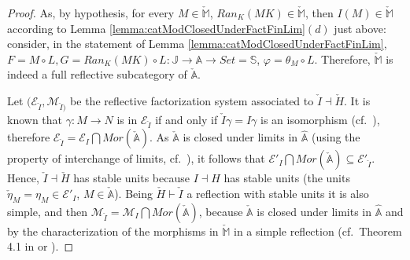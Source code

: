 \documentclass[12pt,a4paper]{amsart}
\theoremstyle{definition}
\begin{document}
\begin{proof}
As, by hypothesis, for every $M\in\check{\mathbb{M}}$, $Ran_K(MK)\in \check{\mathbb{M}}$, then $I(M)\in\check{\mathbb{M}}$ according to Lemma \ref{lemma:catModClosedUnderFactFinLim}$(d)$ just above: consider, in the statement of Lemma \ref{lemma:catModClosedUnderFactFinLim}, $F=M\circ L, G=Ran_K(MK)\circ L:\mathbb{J}\rightarrow \mathbb{A}\rightarrow Set=\mathbb{S}$, $\varphi=\theta_M\circ L$. Therefore, $\check{\mathbb{M}}$ is indeed a full reflective subcategory of $\check{\mathbb{A}}$.

Let $(\mathcal{E}_{\check{I}},\mathcal{M}_{\check{I})}$ be the reflective factorization system associated to $\check{I}\dashv \check{H}$. It is known that $\gamma: M\rightarrow N$ is in $\mathcal{E}_{\check{I}}$ if and only if $\check{I}\gamma =I\gamma$ is an isomorphism (cf.\ \cite[\S 3.1]{CJKP:stab}), therefore $\mathcal{E}_{\check{I}}=\mathcal{E}_I\bigcap Mor(\check{\mathbb{A}})$. As $\check{\mathbb{A}}$ is closed under limits in $\hat{\mathbb{A}}$ (using the property of interchange of limits, cf.\ \cite[\S IX.2]{SM:cat}), it follows that $\mathcal{E}'_I\bigcap Mor(\check{\mathbb{A}})\subseteq \mathcal{E}'_{\check{I}}$. Hence, $\check{I}\dashv \check{H}$ has stable units because $I\dashv H$ has stable units (the units $\check{\eta}_M=\eta_M\in \mathcal{E}'_I$, $M\in\check{\mathbb{A}}$). Being $\check{H}\vdash \check{I}$ a reflection with stable units it is also simple, and then $\mathcal{M}_{\check{I}}=\mathcal{M}_I\bigcap Mor(\check{\mathbb{A}})$, because $\check{\mathbb{A}}$ is closed under limits in $\hat{\mathbb{A}}$ and by the characterization of the morphisms in $\check{\mathbb{M}}$ in a simple reflection (cf.\ Theorem 4.1 in \cite{CHK:fact} or \cite[\S 3.5]{CJKP:stab}).\end{proof}
\end{document}
